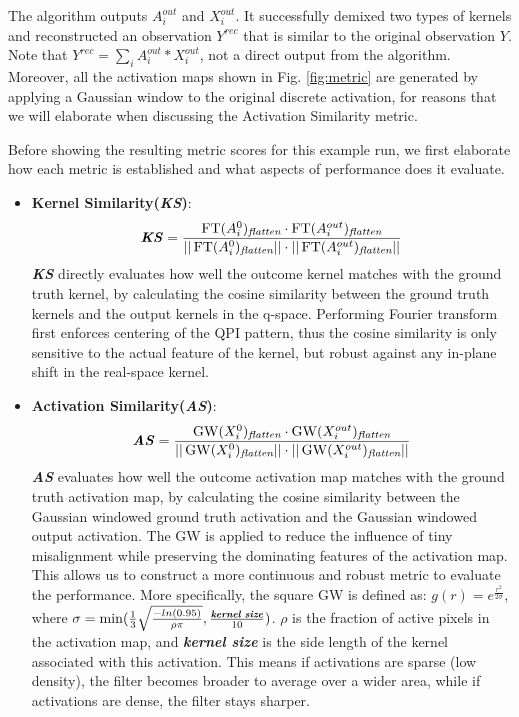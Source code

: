 The algorithm outputs $A_i^{out}$ and $X_i^{out}$. It successfully demixed two types of kernels and reconstructed an observation $Y^{rec}$ that is similar to the original observation $Y$. Note that $Y^{rec} = \sum_i A^{out}_i * X^{out}_i$, not a direct output from the algorithm. Moreover, all the activation maps shown in Fig. \ref{fig:metric} are generated by applying a Gaussian window to the original discrete activation, for reasons that we will elaborate when discussing the Activation Similarity metric. 

Before showing the resulting metric scores for this example run, we first elaborate how each metric is established and what aspects of performance does it evaluate. 
\begin{itemize}
	\item \textbf{Kernel Similarity(\textit{KS})}: 
	\begin{equation}
		\textbf{\textit{KS}} = \frac{\operatorname{FT}(A_i^0)_{\textit{flatten}} \cdot  \operatorname{FT}(A_i^{out})_{\textit{flatten}}}{\vert \vert \operatorname{FT}(A_i^0)_{\textit{flatten}} \vert \vert \cdot  \vert \vert \operatorname{FT}(A_i^{out})_{\textit{flatten}}\vert \vert}
	\end{equation}
	\textbf{\textit{KS}} directly evaluates how well the outcome kernel matches with the ground truth kernel, by calculating the cosine similarity between the ground truth kernels and the output kernels in the q-space. Performing Fourier transform first enforces centering of the \ac{QPI} pattern, thus the cosine similarity is only sensitive to the actual feature of the kernel, but robust against any in-plane shift in the real-space kernel. 
	
	\item \textbf{Activation Similarity(\textit{AS})}: 
	\begin{equation}
		\textbf{\textit{AS}} = \frac{\operatorname{GW}(X_i^0)_{\textit{flatten}} \cdot  \operatorname{GW}(X_i^{out})_{\textit{flatten}}}{\vert \vert \operatorname{GW}(X_i^0)_{\textit{flatten}} \vert \vert \cdot  \vert \vert \operatorname{GW}(X_i^{out})_{\textit{flatten}}\vert \vert}
	\end{equation}
	\textbf{\textit{AS}} evaluates how well the outcome activation map matches with the ground truth activation map, by calculating the cosine similarity between the Gaussian windowed ground truth activation and the Gaussian windowed output activation. The GW is applied to reduce the influence of tiny misalignment while preserving the dominating features of the activation map. This allows us to construct a more continuous and robust metric to evaluate the performance. More specifically, the square GW is defined as: $g(r)= e^{\frac{r^2}{2 \sigma}}$, where $\sigma = \operatorname{min}(\frac{1}{3}\sqrt{\frac{-ln(0.95)}{\rho \pi}}, \frac{\textbf{\textit{kernel size}}}{10})$. $\rho$ is the fraction of active pixels in the activation map, and \textbf{\textit{kernel size}} is the side length of the kernel associated with this activation. This means if activations are sparse (low density), the filter becomes broader to average over a wider area, while if activations are dense, the filter stays sharper.
	

\end{itemize}
